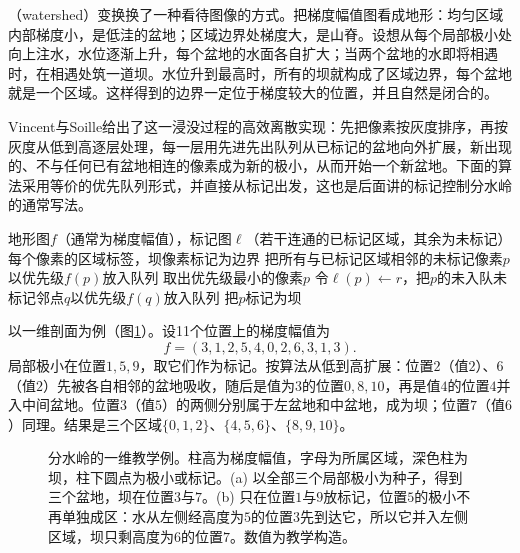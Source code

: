 （watershed）变换换了一种看待图像的方式。把梯度幅值图看成地形：均匀区域内部梯度小，是低洼的盆地；区域边界处梯度大，是山脊。设想从每个局部极小处向上注水，水位逐渐上升，每个盆地的水面各自扩大；当两个盆地的水即将相遇时，在相遇处筑一道坝。水位升到最高时，所有的坝就构成了区域边界，每个盆地就是一个区域。这样得到的边界一定位于梯度较大的位置，并且自然是闭合的。

Vincent与Soille给出了这一浸没过程的高效离散实现：先把像素按灰度排序，再按灰度从低到高逐层处理，每一层用先进先出队列从已标记的盆地向外扩展，新出现的、不与任何已有盆地相连的像素成为新的极小，从而开始一个新盆地。下面的算法采用等价的优先队列形式，并直接从标记出发，这也是后面讲的标记控制分水岭的通常写法。

\begin{algorithm}[基于优先队列的分水岭]
  \label{alg:vision-features-watershed}
  \begin{algorithmic}[1]
    \Require 地形图$f$（通常为梯度幅值），标记图$\ell$（若干连通的已标记区域，其余为未标记）
    \Ensure 每个像素的区域标签，坝像素标记为边界
    \State 把所有与已标记区域相邻的未标记像素$p$以优先级$f(p)$放入队列
      \State 取出优先级最小的像素$p$
        \State 令$\ell(p)\gets r$，把$p$的未入队未标记邻点$q$以优先级$f(q)$放入队列
      \Else
        \State 把$p$标记为坝 
      \EndIf
    \EndWhile
  \end{algorithmic}
\end{algorithm}

以一维剖面为例（图\ref{fig:vision-features-watershed}）。设11个位置上的梯度幅值为
\[
  f=(3,1,2,5,4,0,2,6,3,1,3).
\]
局部极小在位置$1,5,9$，取它们作为标记。按算法从低到高扩展：位置$2$（值$2$）、$6$（值$2$）先被各自相邻的盆地吸收，随后是值为$3$的位置$0,8,10$，再是值$4$的位置$4$并入中间盆地。位置$3$（值$5$）的两侧分别属于左盆地和中盆地，成为坝；位置$7$（值$6$）同理。结果是三个区域$\{0,1,2\}$、$\{4,5,6\}$、$\{8,9,10\}$。

\begin{figure}[htbp]
  \centering
  
  \caption{分水岭的一维教学例。柱高为梯度幅值，字母为所属区域，深色柱为坝，柱下圆点为极小或标记。(a) 以全部三个局部极小为种子，得到三个盆地，坝在位置$3$与$7$。(b) 只在位置$1$与$9$放标记，位置$5$的极小不再单独成区：水从左侧经高度为$5$的位置$3$先到达它，所以它并入左侧区域，坝只剩高度为$6$的位置$7$。数值为教学构造。}
  \label{fig:vision-features-watershed}
\end{figure}

